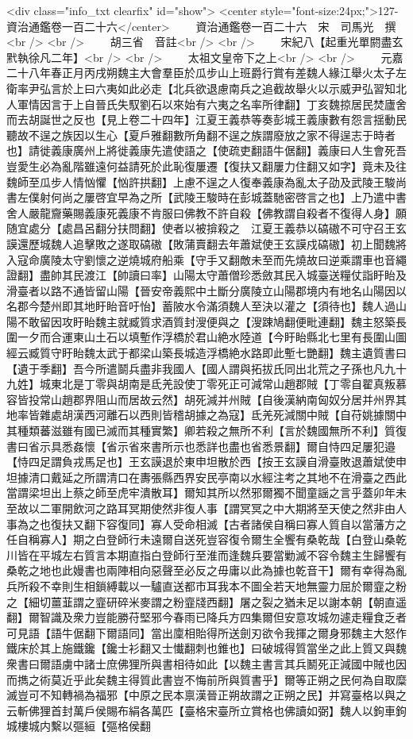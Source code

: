 <div class="info_txt clearfix" id="show">
<center style="font-size:24px;">127-資治通鑑卷一百二十六</center>
  　　資治通鑑卷一百二十六　宋　司馬光　撰<br />
<br />
　　胡三省　音註<br />
<br />
　　宋紀八【起重光單閼盡玄黓執徐凡二年】<br />
<br />
　　太祖文皇帝下之上<br />
<br />
　　元嘉二十八年春正月丙戌朔魏主大會羣臣於瓜步山上班爵行賞有差魏人緣江舉火太子左衛率尹弘言於上曰六夷如此必走【北兵欲退慮南兵之追截故舉火以示威尹弘習知北人軍情因言于上自晉氏失馭劉石以來始有六夷之名率所律翻】丁亥魏掠居民焚廬舍而去胡誕世之反也【見上卷二十四年】江夏王義恭等奏彭城王義康數有怨言揺動民聽故不逞之族因以生心【夏戶雅翻數所角翻不逞之族謂廢放之家不得逞志于時者也】請徙義康廣州上將徙義康先遣使語之【使疏吏翻語牛倨翻】義康曰人生會死吾豈愛生必為亂階雖遠何益請死於此恥復屢遷【復扶又翻屢力住翻又如字】竟未及往魏師至瓜步人情忷懼【忷許拱翻】上慮不逞之人復奉義康為亂太子劭及武陵王駿尚書左僕射何尚之屢啓宜早為之所【武陵王駿時在彭城蓋馳密啓言之也】上乃遣中書舍人嚴龍齎藥賜義康死義康不肯服曰佛教不許自殺【佛教謂自殺者不復得人身】願随宜處分【處昌呂翻分扶問翻】使者以被揜殺之　江夏王義恭以碻磝不可守召王玄謨還歷城魏人追擊敗之遂取碻磝【敗蒲賣翻去年蕭斌使王玄謨戍碻磝】初上聞魏將入寇命廣陵太守劉懷之逆燒城府船乘【守手又翻敵未至而先燒故曰逆乘謂車也音繩證翻】盡帥其民渡江【帥讀曰率】山陽太守蕭僧珍悉斂其民入城臺送糧仗詣盱眙及滑臺者以路不通皆留山陽【晉安帝義熙中土斷分廣陵立山陽郡境内有地名山陽因以名郡今楚州即其地盱眙音吁怡】蓄陂水令滿須魏人至決以灌之【須待也】魏人過山陽不敢留因攻盱眙魏主就臧質求酒質封溲便與之【溲踈鳩翻便毗連翻】魏主怒築長圍一夕而合運東山土石以填塹作浮橋於君山絶水陸道【今盱眙縣北七里有長圍山圖經云臧質守盱眙魏太武于都梁山築長城造浮橋絶水路即此塹七艷翻】魏主遺質書曰【遺于季翻】吾今所遣鬬兵盡非我國人【國人謂與拓拔氏同出北荒之子孫也凡九十九姓】城東北是丁零與胡南是氐羌設使丁零死正可減常山趙郡賊【丁零自翟真叛慕容皆投常山趙郡界阻山而居故云然】胡死減并州賊【自後漢納南匈奴分居并州界其地率皆雜處胡漢西河離石以西則皆稽胡據之為寇】氐羌死減關中賊【自苻姚據關中其種類蕃滋雖有國已滅而其種實繁】卿若殺之無所不利【言於魏國無所不利】質復書曰省示具悉姦懷【省示省來書所示也悉詳也盡也省悉景翻】爾自恃四足屢犯邉【恃四足謂負戎馬足也】王玄謨退於東申坦散於西【按王玄謨自滑臺敗退蕭斌使申坦據清口戴延之所謂清口在夀張縣西界安民亭南以水經注考之其地不在滑臺之西此當謂梁坦出上蔡之師至虎牢潰散耳】爾知其所以然邪爾獨不聞童謡之言乎蓋卯年未至故以二軍開飲河之路耳冥期使然非復人事【謂冥冥之中大期將至天使之然非由人事為之也復扶又翻下容復同】寡人受命相滅【古者諸侯自稱曰寡人質自以當藩方之任自稱寡人】期之白登師行未遠爾自送死豈容復令爾生全饗有桑乾哉【白登山桑乾川皆在平城左右質言本期直指白登師行至淮而逢魏兵要當勦滅不容令魏主生歸饗有桑乾之地也此嫚書也兩陣相向惡聲至必反之毋庸以此為據也乾音干】爾有幸得為亂兵所殺不幸則生相鎖縛載以一驢直送都市耳我本不圖全若天地無靈力屈於爾韲之粉之【細切薑韮謂之韲研碎米麥謂之粉韲牋西翻】屠之裂之猶未足以謝本朝【朝直遥翻】爾智識及衆力豈能勝苻堅邪今春雨已降兵方四集爾但安意攻城勿遽走糧食乏者可見語【語牛倨翻下爾語同】當出廩相貽得所送劍刃欲令我揮之爾身邪魏主大怒作鐵床於其上施鐵鑱【鑱士衫翻又士懴翻刺也錐也】曰破城得質當坐之此上質又與魏衆書曰爾語虜中諸士庶佛狸所與書相待如此【以魏主書言其兵鬭死正減國中賊也因而擕之術莫近乎此矣魏主得質此書豈不悔前所與質書乎】爾等正朔之民何為自取糜滅豈可不知轉禍為福邪【中原之民本禀漢晉正朔故謂之正朔之民】并寫臺格以與之云斬佛狸首封萬戶侯賜布絹各萬匹【臺格宋臺所立賞格也佛讀如弼】魏人以鉤車鉤城樓城内繫以彄絙【彄格侯翻